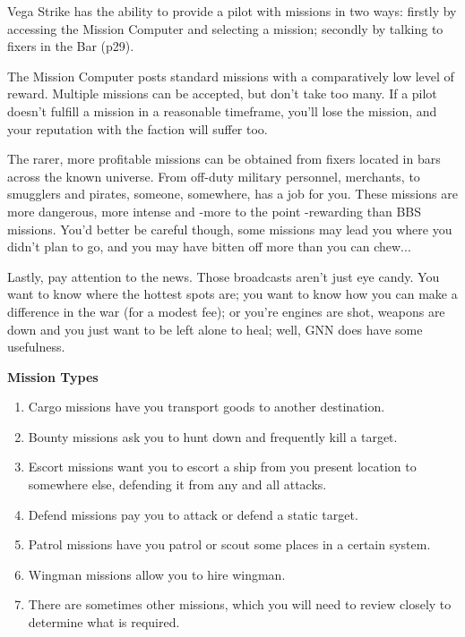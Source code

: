 \documentclass{article}
\begin{document}
Vega Strike has the ability to provide a pilot with missions in two ways: firstly by accessing the Mission Computer and selecting a mission; secondly by talking to fixers in the Bar (p29). 

The Mission Computer posts standard missions with a comparatively low level of reward. Multiple missions can be accepted, but don't take too many. If a pilot doesn't fulfill a mission in a reasonable timeframe, you'll lose the mission, and your reputation with the faction will suffer too. 

The rarer, more profitable missions can be obtained from fixers located in bars across the known universe. From off-duty military personnel, merchants, to smugglers and pirates, someone, somewhere, has a job for you. These missions are more dangerous, more intense and -more to the point -rewarding than BBS missions. You'd better be careful though, some missions may lead you where you didn't plan to go, and you may have bitten off more than you can chew... 



Lastly, pay attention to the news. Those broadcasts aren't just eye candy. You want to know where the hottest spots are; you want to know how you can make a difference in the war (for a modest fee); or you're engines are shot, weapons are down and you just want to be left alone to heal; well, GNN does have some usefulness. 

\textbf{Mission Types }

\begin{enumerate}
\item \textbf{ }Cargo missions have you transport goods to another destination. 

\item  Bounty missions ask you to hunt down and frequently kill a target. 

\item  Escort missions want you to escort a ship from you present location to somewhere else, defending it from any and all attacks. 

\item  Defend missions pay you to attack or defend a static target. 

\item  Patrol missions have you patrol or scout some places in a certain system. 

\item  Wingman missions allow you to hire wingman. 

\item  There are sometimes other missions, which you will need to review closely to determine what is required. 
\end{enumerate}
\end{document}
